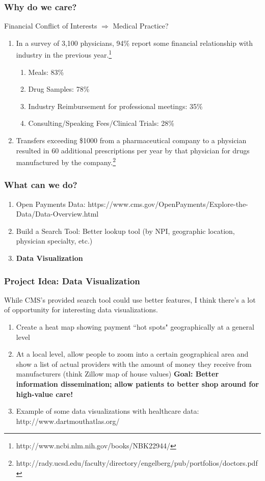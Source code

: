 \documentclass{beamer}
\begin{document}
\begin{frame} 
\frametitle{Why do we care?}
Financial Conflict of Interests $\Rightarrow$ Medical Practice?
\begin{enumerate}
\item In a survey of 3,100 physicians, 94\% report some financial relationship with industry in the previous year.\footnote{http://www.ncbi.nlm.nih.gov/books/NBK22944/}

\begin{enumerate}
\item Meals: 83\%
\item Drug Samples: 78\%
\item Industry Reimbursement for professional meetings: 35\%
\item Consulting/Speaking Fees/Clinical Trials: 28\%
\end{enumerate}

\item Transfers exceeding \$1000 from a pharmaceutical company to a physician resulted in 60 additional prescriptions per year by that physician for drugs manufactured by the company.\footnote{http://rady.ucsd.edu/faculty/directory/engelberg/pub/portfolios/doctors.pdf}
\end{enumerate}
\end{frame}

\begin{frame} 
\frametitle{What can we do?}
\begin{enumerate}
\item Open Payments Data: https://www.cms.gov/OpenPayments/Explore-the-Data/Data-Overview.html
\item Build a Search Tool: Better lookup tool (by NPI, geographic location, physician specialty, etc.)
\item \textbf{Data Visualization}
\end{enumerate}
\end{frame}

\begin{frame} 
\frametitle{Project Idea: Data Visualization}
While CMS's provided search tool could use better features, I think there's a lot of opportunity for interesting data visualizations.

\begin{enumerate}
\item Create a heat map showing payment ``hot spots" geographically at a general level
\item At a local level, allow people to zoom into a certain geographical area and show a list of actual providers with the amount of money they receive from manufacturers (think Zillow map of house values)
\textbf{Goal: Better information dissemination; allow patients to better shop around for high-value care!}
\item Example of some data visualizations with healthcare data: http://www.dartmouthatlas.org/
\end{enumerate}
\end{frame}
\end{document}
